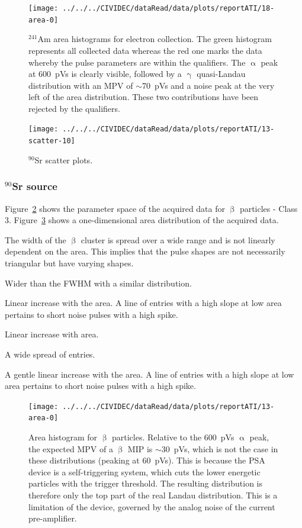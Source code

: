 \begin{figure}[]
\centering
\texttt{[image: ../../../CIVIDEC/dataRead/data/plots/reportATI/18-area-0]}
\caption{$^{241}$Am area histograms for electron collection. The green histogram represents all collected data whereas the red one marks the data whereby the pulse parameters are within the qualifiers. The $\upalpha$ peak at 600~pVs is clearly visible, followed by a $\upgamma$ quasi-Landau distribution with an MPV of $\sim$70~pVs and a noise peak at the very left of the area distribution. These two contributions have been rejected by the qualifiers.}
\label{fig:1dalphaareae}
\end{figure}




\clearpage
\begin{figure}[]
\centering
\texttt{[image: ../../../CIVIDEC/dataRead/data/plots/reportATI/13-scatter-10]}
\caption{$^{90}$Sr scatter plots.}
\label{fig:scattersr}
\end{figure}

\clearpage
\subsubsection{$^{90}$Sr source}
Figure~\ref{fig:scattersr} shows the parameter space of the acquired data for $\upbeta$ particles - Class 3. Figure~\ref{fig:1dsrarea} shows a one-dimensional area distribution of the acquired data. 
\begin{description}
\setlength\itemsep{-0.3em}
\item[Width: ] The width of the $\upbeta$ cluster is spread over a wide range and is not linearly dependent on the area. This implies that the pulse shapes are not necessarily triangular but have varying shapes.
\item[Base width: ] Wider than the FWHM with a similar distribution.
\item[Amplitude: ] Linear increase with the area. A line of entries with a high slope at low area pertains to short noise pulses with a high spike.
\item[Calculated area: ] Linear increase with area.
\item[Base width -- width: ] A wide spread of entries.
\item[Slope: ] A gentle linear increase with the area. A line of entries with a high slope at low area pertains to short noise pulses with a high spike.
\end{description}


\begin{figure}[]
\centering
\texttt{[image: ../../../CIVIDEC/dataRead/data/plots/reportATI/13-area-0]}
\caption{Area histogram for $\upbeta$ particles. Relative to the 600~pVs $\upalpha$ peak, the expected MPV of a $\upbeta$ MIP is $\sim$30~pVs, which is not the case in these distributions (peaking at 60~pVs). This is because the PSA device is a self-triggering system, which cuts the lower energetic particles with the trigger threshold. The resulting distribution is therefore only the top part of the real Landau distribution. This is a limitation of the device, governed by the analog noise of the current pre-amplifier.}
\label{fig:1dsrarea}
\end{figure} 
 
